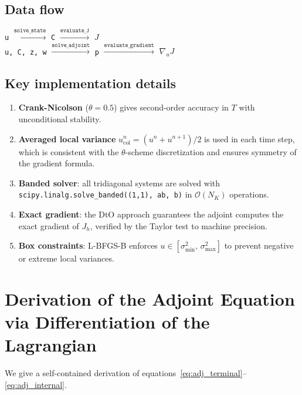 \documentclass[11pt, a4paper]{article}
\theoremstyle{definition}
\theoremstyle{plain}
\begin{document}
\subsection{Data flow}

\begin{center}
\texttt{u} $\xrightarrow{\texttt{solve\_state}}$
\texttt{C} $\xrightarrow{\texttt{evaluate\_J}}$
$J$ \\[4pt]
\texttt{u, C, z, w} $\xrightarrow{\texttt{solve\_adjoint}}$
\texttt{p} $\xrightarrow{\texttt{evaluate\_gradient}}$
$\nabla_u J$
\end{center}

\subsection{Key implementation details}

\begin{enumerate}
  \item \textbf{Crank-Nicolson} ($\theta = 0.5$) gives second-order
    accuracy in $T$ with unconditional stability.
  \item \textbf{Averaged local variance} $u_\text{col}^n = (u^n + u^{n+1})/2$
    is used in each time step, which is consistent with the $\theta$-scheme
    discretization and ensures symmetry of the gradient formula.
  \item \textbf{Banded solver}: all tridiagonal systems are solved with
    \texttt{scipy.linalg.solve\_banded((1,1), ab, b)} in $\mathcal{O}(N_K)$
    operations.
  \item \textbf{Exact gradient}: the DtO approach guarantees the adjoint
    computes the exact gradient of $J_h$, verified by the Taylor test to
    machine precision.
  \item \textbf{Box constraints}: L-BFGS-B enforces $u \in [\sigma_{\min}^2,\,\sigma_{\max}^2]$
    to prevent negative or extreme local variances.
\end{enumerate}

\appendix
\section{Derivation of the Adjoint Equation via Differentiation of the Lagrangian}
\label{app:adjoint_derivation}

We give a self-contained derivation of equations~\eqref{eq:adj_terminal}--\eqref{eq:adj_internal}.
\end{document}
